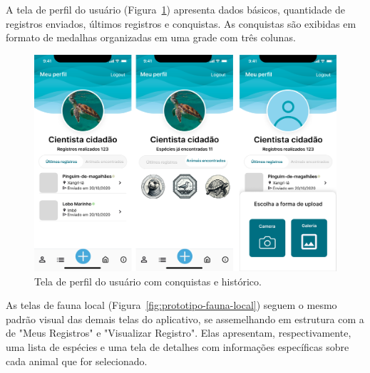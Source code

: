 A tela de perfil do usuário (Figura~\ref{fig:prototipo-perfil}) apresenta dados básicos, 
quantidade de registros enviados, últimos registros e conquistas. As conquistas são exibidas 
em formato de medalhas organizadas em uma grade com três colunas.

\begin{figure}[H]
    \centering
    \includegraphics[height=0.53\textheight, width=\textwidth]{imagens/perfil-figma.png}
    \caption{Tela de perfil do usuário com conquistas e histórico.}
    \label{fig:prototipo-perfil}
\end{figure}

As telas de fauna local (Figura~\ref{fig:prototipo-fauna-local}) seguem o mesmo padrão visual 
das demais telas do aplicativo, se assemelhando em estrutura com a de "Meus Registros" e 
"Visualizar Registro". Elas apresentam, respectivamente, uma lista de espécies e uma 
tela de detalhes com informações específicas sobre cada animal que for selecionado.

